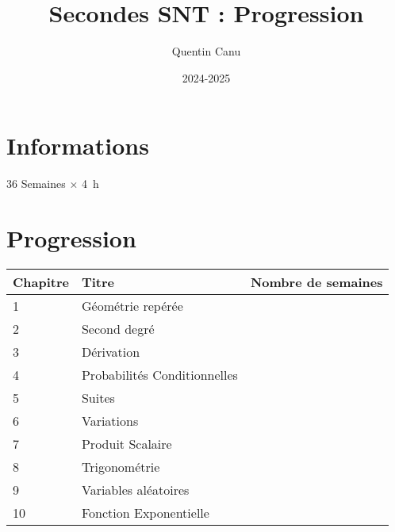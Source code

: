 \documentclass{article}
\title{Secondes SNT : Progression}
\author{Quentin Canu}
\date{2024-2025}
\begin{document}
\maketitle

\section{Informations}

36 Semaines $\times$ \qty{4}{\hour}

\section{Progression}

\begin{center}
    
\begin{tabular}{|l|p{4cm}|p{2cm}|}
\hline
Chapitre
    & 
Titre
        & 
Nombre de semaines\\
\hline
1   &
Géométrie repérée
        &
\\
\hline
2   &
Second degré
        &
\\
\hline
3   &
Dérivation
        &
\\
\hline
4   &
Probabilités Conditionnelles
        &
\\
\hline
5   &
Suites
        &
\\
\hline
6   &
Variations
        &
\\
\hline
7   &
Produit Scalaire
        &
\\
\hline
8   &
Trigonométrie
        &
\\
\hline
9   &
Variables aléatoires
        &
\\
\hline
10  &
Fonction Exponentielle
        &
\\
\hline
\end{tabular}
\end{center}
\end{document}
